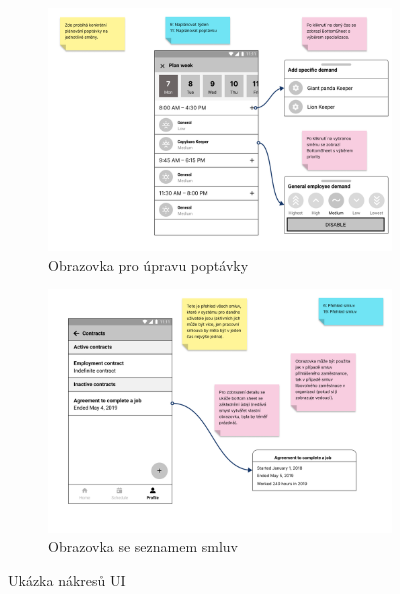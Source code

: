 \documentclass[a4paper,11pt,openany,twoside]{book}
\begin{document}
\begin{figure}
	\centering
	\begin{subfigure}{\textwidth}
		\centering
		\includegraphics[width=\textwidth]{Demand.png}
		\caption{Obrazovka pro úpravu poptávky}
		\label{sub:lfp1}
	\end{subfigure}

	\begin{subfigure}{\textwidth}
		\centering
		\includegraphics[width=\textwidth]{contracts.png}
		\caption{Obrazovka se seznamem smluv}
		\label{sub:lfp2}
	\end{subfigure}

	\caption{Ukázka nákresů UI}
	\label{fig:lfp}
\end{figure}


\newpage
\end{document}
